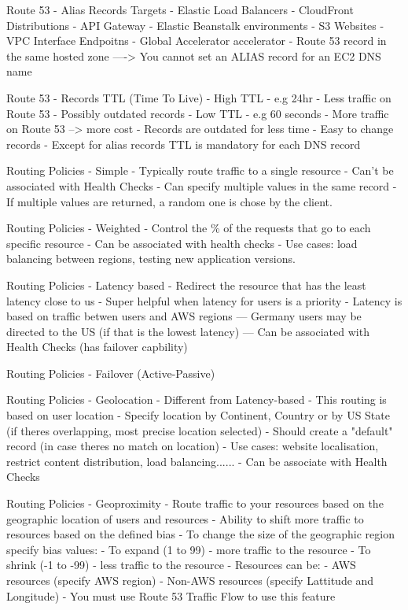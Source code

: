 Route 53 - Alias Records Targets
- Elastic Load Balancers
- CloudFront Distributions
- API Gateway
- Elastic Beanstalk environments
- S3 Websites
- VPC Interface Endpoitns
- Global Accelerator accelerator
- Route 53 record in the same hosted zone
----> You cannot set an ALIAS record for an EC2 DNS name

Route 53 - Records TTL (Time To Live)
- High TTL - e.g 24hr
- Less traffic on Route 53
- Possibly outdated records
- Low TTL - e.g 60 seconds
- More traffic on Route 53 --> more cost
- Records are outdated for less time
- Easy to change records
- Except for alias records TTL is mandatory for each DNS record

Routing Policies - Simple
- Typically route traffic to a single resource
- Can't be associated with Health Checks
- Can specify multiple values in the same record
- If multiple values are returned, a random one is chose by the client.

Routing Policies - Weighted
- Control the \% of the requests that go to each specific resource
- Can be associated with health checks
- Use cases: load balancing between regions, testing new application versions.

Routing Policies - Latency based
- Redirect the resource that has the least latency close to us
- Super helpful when latency for users is a priority
- Latency is based on traffic betwen users and AWS regions
--- Germany users may be directed to the US (if that is the lowest latency)
--- Can be associated with Health Checks (has failover capbility)

Routing Policies - Failover (Active-Passive)

Routing Policies - Geolocation
- Different from Latency-based
- This routing is based on user location
- Specify location by Continent, Country or by US State (if theres overlapping, most precise location selected)
- Should create a "default" record (in case theres no match on location)
- Use cases: website localisation, restrict content distribution, load balancing......
- Can be associate with Health Checks

Routing Policies - Geoproximity
- Route traffic to your resources based on the geographic location of users and resources
- Ability to shift more traffic to resources based on the defined bias
- To change the size of the geographic region specify bias values:
- To expand (1 to 99) - more traffic to the resource
- To shrink (-1 to -99) - less traffic to the resource
- Resources can be:
- AWS resources (specify AWS region)
- Non-AWS resources (specify Lattitude and Longitude)
- You must use Route 53 Traffic Flow to use this feature

